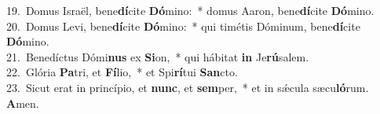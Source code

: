 {19.~}Domus Israël, bene\textbf{dí}cite \textbf{Dó}mino:~* domus Aaron, bene\textbf{dí}cite \textbf{Dó}mino.\\
{20.~}Domus Levi, bene\textbf{dí}cite \textbf{Dó}mino:~* qui timétis Dóminum, bene\textbf{dí}cite \textbf{Dó}mino.\\
{21.~}Benedíctus Dómi\textbf{nus} ex \textbf{Si}on,~* qui hábitat \textbf{in} Je\textbf{rú}salem.\\
{22.~}Glória \textbf{Pa}tri, et \textbf{Fí}lio,~* et Spi\textbf{rí}tui \textbf{San}cto.\\
{23.~}Sicut erat in princípio, et \textbf{nunc}, et \textbf{sem}per,~* et in sǽcula sæcu\textbf{ló}rum. \textbf{A}men.\\
